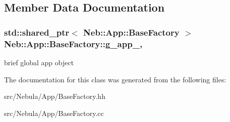 \subsection{Member Data Documentation}
\hypertarget{classNeb_1_1App_1_1BaseFactory_a2add590edaa414b5346b67af7ce9d344}{
\subsubsection[{g\-\_\-app\-\_\-}]{\setlength{\rightskip}{0pt plus 5cm}std\-::shared\-\_\-ptr$<$ {\bf Neb\-::\-App\-::\-Base\-Factory} $>$ Neb\-::\-App\-::\-Base\-Factory\-::g\-\_\-app\-\_\-\hspace{0.3cm}{\ttfamily [static]}, {\ttfamily [protected]}}}\label{classNeb_1_1App_1_1BaseFactory_a2add590edaa414b5346b67af7ce9d344}
brief global app object 

The documentation for this class was generated from the following files\-:\begin{DoxyCompactItemize}
\item 
src/\-Nebula/\-App/Base\-Factory.\-hh\item 
src/\-Nebula/\-App/Base\-Factory.\-cc\end{DoxyCompactItemize}
